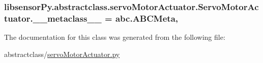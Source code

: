 \subsubsection[{\+\_\+\+\_\+metaclass\+\_\+\+\_\+}]{\setlength{\rightskip}{0pt plus 5cm}libsensor\+Py.\+abstractclass.\+servo\+Motor\+Actuator.\+Servo\+Motor\+Actuator.\+\_\+\+\_\+metaclass\+\_\+\+\_\+ = abc.\+A\+B\+C\+Meta\hspace{0.3cm}{\ttfamily [static]}, {\ttfamily [private]}}\label{classlibsensorPy_1_1abstractclass_1_1servoMotorActuator_1_1ServoMotorActuator_ac6eccff424838f355e683c6323415be0}


The documentation for this class was generated from the following file\+:\begin{DoxyCompactItemize}
\item 
abstractclass/\hyperlink{servoMotorActuator_8py}{servo\+Motor\+Actuator.\+py}\end{DoxyCompactItemize}
